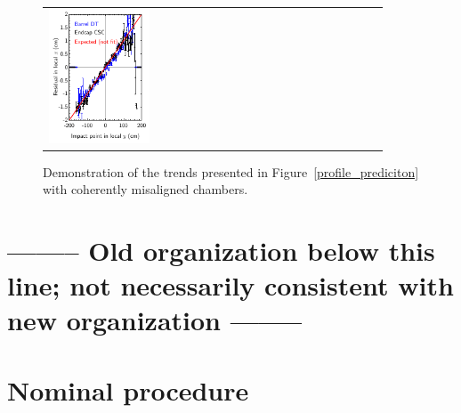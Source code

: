 \documentclass[12pt]{article}
\begin{document}
\begin{figure}
\begin{center}
\begin{tabular}{p{0.3\linewidth} p{0.3\linewidth} p{0.3\linewidth}}
\begin{minipage}{\linewidth}
	\includegraphics[width=\linewidth]{chamber_alignment/phiz_xresid_vs_y.pdf}
      \end{minipage}
    \end{tabular}
  \end{center}

\caption{\label{profile_demonstration} Demonstration of the trends
  presented in Figure~\ref{profile_prediciton} with coherently
  misaligned chambers.}
\end{figure}



\pagebreak

\section{-------- Old organization below this line; not necessarily
  consistent with new organization --------}

\section{Nominal procedure}
\end{document}
